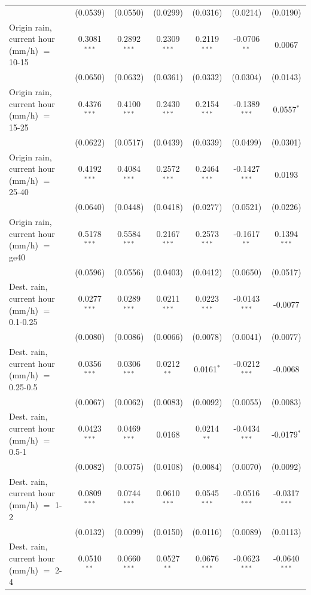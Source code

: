 \begin{tabular}{lcccccc}
    & (0.0539) & (0.0550) & (0.0299) & (0.0316) & (0.0214) & (0.0190)\\
   Origin rain, current hour (mm/h) $=$ 10-15 & 0.3081$^{***}$ & 0.2892$^{***}$ & 0.2309$^{***}$ & 0.2119$^{***}$ & -0.0706$^{**}$ & 0.0067\\
    & (0.0650) & (0.0632) & (0.0361) & (0.0332) & (0.0304) & (0.0143)\\
   Origin rain, current hour (mm/h) $=$ 15-25 & 0.4376$^{***}$ & 0.4100$^{***}$ & 0.2430$^{***}$ & 0.2154$^{***}$ & -0.1389$^{***}$ & 0.0557$^{*}$\\
    & (0.0622) & (0.0517) & (0.0439) & (0.0339) & (0.0499) & (0.0301)\\
   Origin rain, current hour (mm/h) $=$ 25-40 & 0.4192$^{***}$ & 0.4084$^{***}$ & 0.2572$^{***}$ & 0.2464$^{***}$ & -0.1427$^{***}$ & 0.0193\\
    & (0.0640) & (0.0448) & (0.0418) & (0.0277) & (0.0521) & (0.0226)\\
   Origin rain, current hour (mm/h) $=$ ge40 & 0.5178$^{***}$ & 0.5584$^{***}$ & 0.2167$^{***}$ & 0.2573$^{***}$ & -0.1617$^{**}$ & 0.1394$^{***}$\\
    & (0.0596) & (0.0556) & (0.0403) & (0.0412) & (0.0650) & (0.0517)\\
   Dest. rain, current hour (mm/h) $=$ 0.1-0.25 & 0.0277$^{***}$ & 0.0289$^{***}$ & 0.0211$^{***}$ & 0.0223$^{***}$ & -0.0143$^{***}$ & -0.0077\\
    & (0.0080) & (0.0086) & (0.0066) & (0.0078) & (0.0041) & (0.0077)\\
   Dest. rain, current hour (mm/h) $=$ 0.25-0.5 & 0.0356$^{***}$ & 0.0306$^{***}$ & 0.0212$^{**}$ & 0.0161$^{*}$ & -0.0212$^{***}$ & -0.0068\\
    & (0.0067) & (0.0062) & (0.0083) & (0.0092) & (0.0055) & (0.0083)\\
   Dest. rain, current hour (mm/h) $=$ 0.5-1 & 0.0423$^{***}$ & 0.0469$^{***}$ & 0.0168 & 0.0214$^{**}$ & -0.0434$^{***}$ & -0.0179$^{*}$\\
    & (0.0082) & (0.0075) & (0.0108) & (0.0084) & (0.0070) & (0.0092)\\
   Dest. rain, current hour (mm/h) $=$ 1-2 & 0.0809$^{***}$ & 0.0744$^{***}$ & 0.0610$^{***}$ & 0.0545$^{***}$ & -0.0516$^{***}$ & -0.0317$^{***}$\\
    & (0.0132) & (0.0099) & (0.0150) & (0.0116) & (0.0089) & (0.0113)\\
   Dest. rain, current hour (mm/h) $=$ 2-4 & 0.0510$^{**}$ & 0.0660$^{***}$ & 0.0527$^{**}$ & 0.0676$^{***}$ & -0.0623$^{***}$ & -0.0640$^{***}$\\

\end{tabular}
